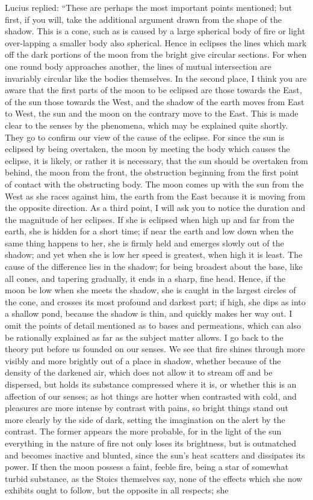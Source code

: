 \documentclass[a4paper, 11pt, oneside, polutonikogreek, english]{article}
\begin{document}
Lucius replied: ``These are perhaps the most important points mentioned; but first, if you will, take the additional argument drawn from the shape of the shadow. This is a cone, such as is caused by a large spherical body of fire or light over-lapping a smaller body also spherical. Hence in eclipses the lines which mark off the dark portions of the moon from the bright give circular sections. For when one round body approaches another, the lines of mutual intersection are invariably circular like the bodies themselves. In the second place, I think you are aware that the first parts of the moon to be eclipsed are those towards the East, of the sun those towards the West, and the shadow of the earth moves from East to West, the sun and the moon on the contrary move to the East. This is made clear to the senses by the phenomena, which may be explained quite shortly. They go to confirm our view of the cause of the eclipse. For since the sun is eclipsed by being overtaken, the moon by meeting the body which causes the eclipse, it is likely, or rather it is necessary, that the sun should be overtaken from behind, the moon from the front, the obstruction beginning from the first point of contact with the obstructing body. The moon comes up with the sun from the West as she races against him, the earth from the East because it is moving from the opposite direction. As a third point, I will ask you to notice the duration and the magnitude of her eclipses. If she is eclipsed when high up and far from the earth, she is hidden for a short time; if near the earth and low down when the same thing happens to her, she is firmly held and emerges slowly out of the shadow; and yet when she is low her speed is greatest, when high it is least. The cause of the difference lies in the shadow; for being broadest about the base, like all cones, and tapering gradually, it ends in a sharp, fine head. Hence, if the moon be low when she meets the shadow, she is caught in the largest circles of the cone, and crosses its most profound and darkest part; if high, she dips as into a shallow pond, because the shadow is thin, and quickly makes her way out. I omit the points of detail mentioned as to bases and permeations, which can also be rationally explained as far as the subject matter allows. I go back to the theory put before us founded on our senses. We see that fire shines through more visibly and more brightly out of a place in shadow, whether because of the density of the darkened air, which does not allow it to stream off and be dispersed, but holds its substance compressed where it is, or whether this is an affection of our senses; as hot things are hotter when contrasted with cold, and pleasures are more intense by contrast with pains, so bright things stand out more clearly by the side of dark, setting the imagination on the alert by the contrast. The former appears the more probable, for in the light of the sun everything in the nature of fire not only loses its brightness, but is outmatched and becomes inactive and blunted, since the sun's heat scatters and dissipates its power. If then the moon possess a faint, feeble fire, being a star of somewhat turbid substance, as the Stoics themselves say, none of the effects which she now exhibits ought to follow, but the opposite in all respects; she 
\end{document}
